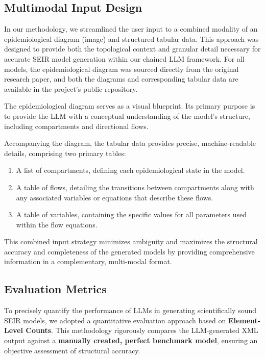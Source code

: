 \documentclass[conference]{IEEEtran}
\begin{document}
\subsection{Multimodal Input Design}

In our methodology, we streamlined the user input to a combined modality of an epidemiological diagram (image) and structured tabular data. This approach was designed to provide both the topological context and granular detail necessary for accurate SEIR model generation within our chained LLM framework. For all models, the epidemiological diagram was sourced directly from the original research paper, and both the diagrams and corresponding tabular data are available in the project's public repository.

The epidemiological diagram serves as a visual blueprint. Its primary purpose is to provide the LLM with a conceptual understanding of the model's structure, including compartments and directional flows.

Accompanying the diagram, the tabular data provides precise, machine-readable details, comprising two primary tables: 
\begin{enumerate}
\item A list of compartments, defining each epidemiological state in the model.
\item A table of flows, detailing the transitions between compartments along with any associated variables or equations that describe these flows.
\item A table of variables, containing the specific values for all parameters used within the flow equations.
\end{enumerate}

This combined input strategy minimizes ambiguity and maximizes the structural accuracy and completeness of the generated models by providing comprehensive information in a complementary, multi-modal format.

\subsection{Evaluation Metrics}
To precisely quantify the performance of LLMs in generating scientifically sound SEIR models, we adopted a quantitative evaluation approach based on \textbf{Element-Level Counts}. This methodology rigorously compares the LLM-generated XML output against a \textbf{manually created, perfect benchmark model}, ensuring an objective assessment of structural accuracy.
\end{document}
